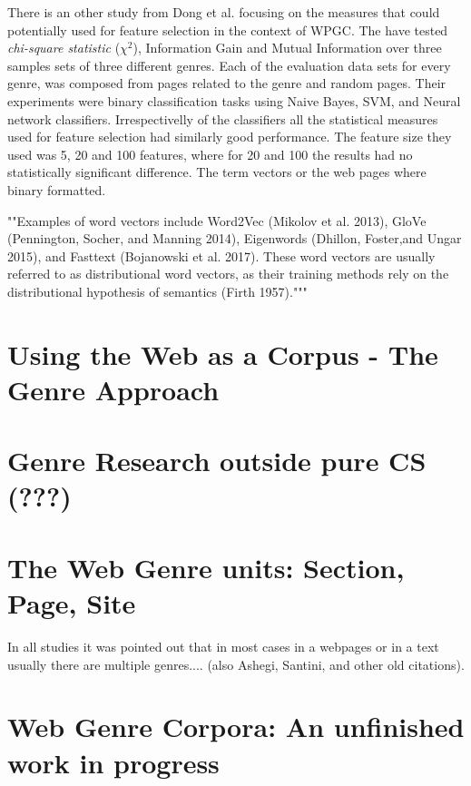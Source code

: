 There is an other study from Dong et al.\parencite{dong2006binary} focusing on the measures that could potentially used for feature selection in the context of WPGC. The have tested\textit{ chi-square statistic} ($\chi^{2}$), Information Gain and Mutual Information over three samples sets of three different genres. Each of the evaluation data sets for every genre, was composed from pages related to the genre and random pages. Their experiments were binary classification tasks using Naive Bayes, SVM, and Neural network classifiers. Irrespectivelly of the classifiers all the statistical measures used for feature selection had similarly good performance. The feature size they used was 5, 20 and 100 features, where for 20 and 100 the results had no statistically significant difference. The term vectors or the web pages where binary formatted.


""Examples of word vectors include Word2Vec (Mikolov et al. 2013), GloVe (Pennington, Socher, and Manning 2014), Eigenwords (Dhillon, Foster,and Ungar 2015), and Fasttext (Bojanowski et al. 2017). These word vectors are usually referred to as distributional word vectors, as their training methods rely on the distributional hypothesis of semantics (Firth 1957)."""


\section{Using the Web as a Corpus - The Genre Approach}\label{chap:relevant_work:sec:intro}

\section{Genre Research outside pure CS (???)}\label{chap:relevant_work:sec:intro}


\section{The Web Genre units: Section, Page, Site}

In all studies it was pointed out that in most cases in a webpages or in a text usually there are multiple genres.... \parencite{lee2017text} (also Ashegi, Santini, and other old citations).


\section{Web Genre Corpora: An unfinished work in progress}\label{chap:relevant_work:sec:intro}

